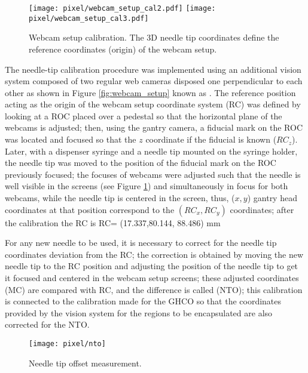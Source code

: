 \begin{figure}[h]
  \begin{center}
    \texttt{[image: pixel/webcam\_setup\_cal2.pdf]}
    \texttt{[image: pixel/webcam\_setup\_cal3.pdf]}\\
    \caption[Webcam setup calibration.]{Webcam setup calibration. The 3D needle tip coordinates define the reference coordinates (origin) of the webcam setup.}\label{fig:webcam_cal}
  \end{center}
\end{figure}

The needle-tip calibration procedure was implemented using an additional vision system composed of two regular web cameras disposed one perpendicular to each other as shown in Figure \ref{fig:webcam_setup} known as . The reference position acting as the origin of the webcam setup coordinate system (RC) was defined by looking at a ROC placed over a pedestal so that the horizontal plane of the webcams is adjusted; then, using the gantry camera, a fiducial mark on the ROC was located and focused so that the $z$ coordinate if the fiducial is known ($RC_z$). Later, with a dispenser syringe and a needle tip mounted on the syringe holder, the needle tip was moved to the position of the fiducial mark on the ROC previously focused; the focuses of webcams were adjusted such that the needle is well visible in the screens (see Figure \ref{fig:webcam_cal}) and simultaneously in focus for both webcams, while the needle tip is centered in the screen, thus, ($x,y$) gantry head coordinates at that position correspond to the $(RC_x, RC_y)$ coordinates; after the calibration the RC is
\beqn 
  RC= (17.337,80.144, 88.486) mm
\eeqn

For any new needle to be used, it is necessary to correct for the needle tip coordinates deviation from the RC; the correction is obtained by moving the new needle tip to the RC position and adjusting the position of the needle tip to get it focused and centered in the webcam setup screens; these adjusted coordinates (MC) are compared with RC, and the difference is called  (NTO); this calibration is connected to the calibration made for the GHCO so that the coordinates provided by the vision system for the regions to be encapsulated are also corrected for the NTO.              

\begin{figure}[h]
  \begin{center}
  \texttt{[image: pixel/nto]}
  \caption[Needle tip offset measurement.]{Needle tip offset measurement.}\label{fig:webcam_adjust}
  \end{center}
\end{figure}

